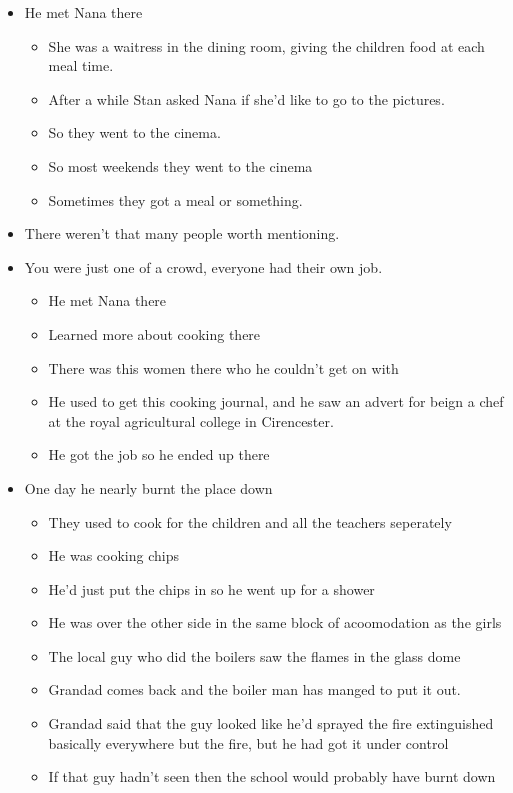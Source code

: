 \documentclass[10pt,twocolumn,letterpaper]{article}
\begin{document}
\begin{itemize}
    \item He met Nana there
    \begin{itemize}
        \item She was a waitress in the dining room, giving the children food at each meal time.
        \item After a while Stan asked Nana if she'd like to go to the pictures.
        \item So they went to the cinema.
        \item So most weekends they went to the cinema
        \item Sometimes they got a meal or something.
    \end{itemize}
    \item There weren't that many people worth mentioning.
    \item You were just one of a crowd, everyone had their own job. 
    \begin{itemize}
        \item He met Nana there
        \item Learned more about cooking there
        \item There was this women there who he couldn't get on with
        \item He used to get this cooking journal, and he saw an advert for beign a chef at the royal agricultural college in Cirencester.
        \item He got the job so he ended up there
    \end{itemize}
    \item One day he nearly burnt the place down
    \begin{itemize}
        \item They used to cook for the children and all the teachers seperately
        \item He was cooking chips
        \item He'd just put the chips in so he went up for a shower
        \item He was over the other side in the same block of acoomodation as the girls
        \item The local guy who did the boilers saw the flames in the glass dome 
        \item Grandad comes back and the boiler man has manged to put it out.
        \item Grandad said that the guy looked like he'd sprayed the fire extinguished basically everywhere but the fire, but he had got it under control
        \item If that guy hadn't seen then the school would probably have burnt down

\end{itemize}
\end{itemize}
\end{document}
